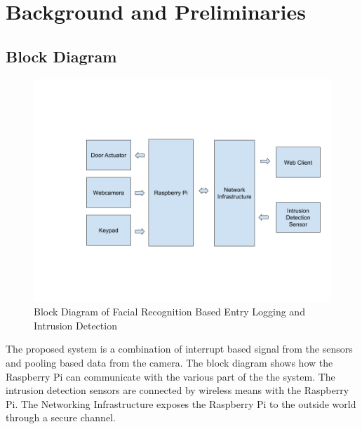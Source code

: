 \chapter{Background and Preliminaries}
\label{chap:Background}
\section{Block Diagram}
\begin{figure}[h!]
    \centering
    \includegraphics[width=13cm]{images/functional_block_diagram.png}
    \caption{Block Diagram of Facial Recognition Based Entry Logging and Intrusion Detection}
\end{figure}

\begin{flushleft}
    The proposed system is a combination of interrupt based signal from the sensors and pooling based data from the 
    camera. The block diagram shows how the Raspberry Pi can communicate with the various part of the the system. 
    The intrusion detection sensors are connected by wireless means with the Raspberry Pi. The Networking Infrastructure
    exposes the Raspberry Pi to the outside world through a secure channel.
\end{flushleft}

